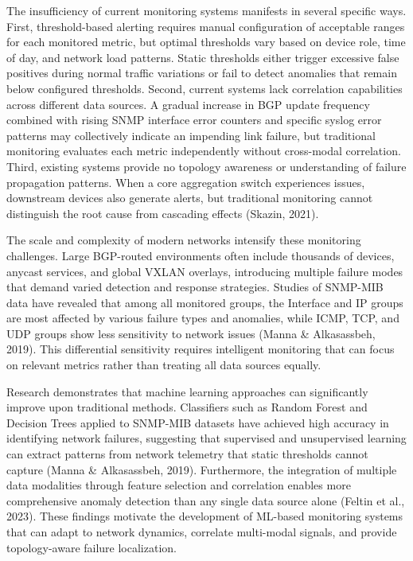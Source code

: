 \documentclass[11pt]{article}
\begin{document}
The insufficiency of current monitoring systems manifests in several specific ways. First, threshold-based alerting requires manual configuration of acceptable ranges for each monitored metric, but optimal thresholds vary based on device role, time of day, and network load patterns. Static thresholds either trigger excessive false positives during normal traffic variations or fail to detect anomalies that remain below configured thresholds. Second, current systems lack correlation capabilities across different data sources. A gradual increase in BGP update frequency combined with rising SNMP interface error counters and specific syslog error patterns may collectively indicate an impending link failure, but traditional monitoring evaluates each metric independently without cross-modal correlation. Third, existing systems provide no topology awareness or understanding of failure propagation patterns. When a core aggregation switch experiences issues, downstream devices also generate alerts, but traditional monitoring cannot distinguish the root cause from cascading effects (Skazin, 2021).

The scale and complexity of modern networks intensify these monitoring challenges. Large BGP-routed environments often include thousands of devices, anycast services, and global VXLAN overlays, introducing multiple failure modes that demand varied detection and response strategies. Studies of SNMP-MIB data have revealed that among all monitored groups, the Interface and IP groups are most affected by various failure types and anomalies, while ICMP, TCP, and UDP groups show less sensitivity to network issues (Manna \& Alkasassbeh, 2019). This differential sensitivity requires intelligent monitoring that can focus on relevant metrics rather than treating all data sources equally.

Research demonstrates that machine learning approaches can significantly improve upon traditional methods. Classifiers such as Random Forest and Decision Trees applied to SNMP-MIB datasets have achieved high accuracy in identifying network failures, suggesting that supervised and unsupervised learning can extract patterns from network telemetry that static thresholds cannot capture (Manna \& Alkasassbeh, 2019). Furthermore, the integration of multiple data modalities through feature selection and correlation enables more comprehensive anomaly detection than any single data source alone (Feltin et al., 2023). These findings motivate the development of ML-based monitoring systems that can adapt to network dynamics, correlate multi-modal signals, and provide topology-aware failure localization.
\end{document}
